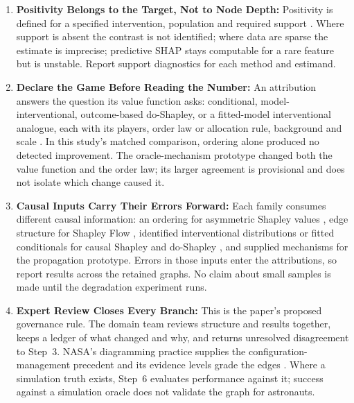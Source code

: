 \documentclass[10pt,a4paper]{article}
\begin{document}
\begin{enumerate}
    \item \textbf{Positivity Belongs to the Target, Not to Node Depth:} Positivity is defined for a specified intervention, population and required support \citep{Petersen2012,WestreichCole2010}. Where support is absent the contrast is not identified; where data are sparse the estimate is imprecise; predictive SHAP stays computable for a rare feature but is unstable. Report support diagnostics for each method and estimand.
    \item \textbf{Declare the Game Before Reading the Number:} An attribution answers the question its value function asks: conditional, model-interventional, outcome-based do-Shapley, or a fitted-model interventional analogue, each with its players, order law or allocation rule, background and scale \citep{Janzing2020,Heskes2020,Jung2022,Frye2020,Wang2021}. In this study's matched comparison, ordering alone produced no detected improvement. The oracle-mechanism prototype changed both the value function and the order law; its larger agreement is provisional and does not isolate which change caused it.
    \item \textbf{Causal Inputs Carry Their Errors Forward:} Each family consumes different causal information: an ordering for asymmetric Shapley values \citep{Frye2020}, edge structure for Shapley Flow \citep{Wang2021}, identified interventional distributions or fitted conditionals for causal Shapley and do-Shapley \citep{Heskes2020,Jung2022}, and supplied mechanisms for the propagation prototype. Errors in those inputs enter the attributions, so report results across the retained graphs. No claim about small samples is made until the degradation experiment runs.
    \item \textbf{Expert Review Closes Every Branch:} This is the paper's proposed governance rule. The domain team reviews structure and results together, keeps a ledger of what changed and why, and returns unresolved disagreement to Step~3. NASA's diagramming practice supplies the configuration-management precedent \citep{Antonsen2024} and its evidence levels grade the edges \citep{Ward2024,Reynolds2022}. Where a simulation truth exists, Step~6 evaluates performance against it; success against a simulation oracle does not validate the graph for astronauts.
\end{enumerate}
\end{document}
